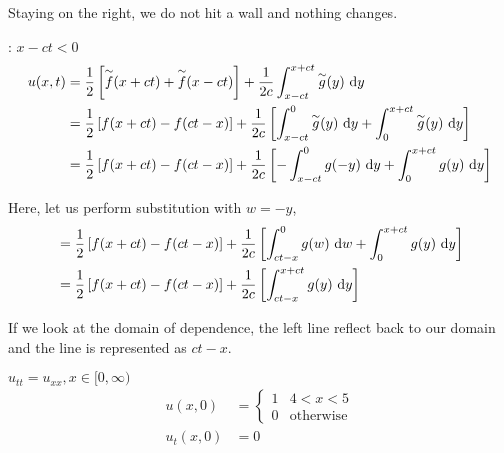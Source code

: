 Staying on the right, we do not hit a wall and nothing changes.

: $x - ct < 0$
%
\begin{align}
  u(x, t)
  & = \frac{1}{2} \left[ \overset{\sim}{f}(x + ct) + \overset{\sim}{f}(x - ct) \right] +
  \frac{1}{2c} \int^{x + ct}_{x - ct} \overset{\sim}{g}(y)\ \text dy\\
  & = \frac{1}{2} \left[ f(x + ct) - f(ct - x) \right] +
  \frac{1}{2c}
  \left[
  \int^{0}_{x - ct} \overset{\sim}{g}(y)\ \text dy +
  \int^{x + ct}_{0} \overset{\sim}{g}(y)\ \text dy
   \right]\\
   & = \frac{1}{2} \left[ f(x + ct) - f(ct - x) \right] +
   \frac{1}{2c}
   \left[
   -\int^{0}_{x - ct} g(-y)\ \text dy +
   \int^{x + ct}_{0} g(y)\ \text dy
    \right]
\end{align}

Here, let us perform substitution with $w = -y$,
%
\begin{align}
  & = \frac{1}{2} \left[ f(x + ct) - f(ct - x) \right] +
  \frac{1}{2c}
  \left[
  \int^{0}_{ct - x} g(w)\ \text dw +
  \int^{x + ct}_{0} g(y)\ \text dy
  \right]\\
  & = \frac{1}{2} \left[ f(x + ct) - f(ct - x) \right] +
  \frac{1}{2c}
  \left[
  \int^{x + ct}_{ct - x} g(y)\ \text dy
  \right]
\end{align}

If we look at the domain of dependence, the left line reflect back to our domain and the line is represented as $ct - x$.

\ex $u_{tt} = u_{xx}, x \in [0, \infty)$
%
\begin{align}
  u(x, 0) & =
  \begin{cases}
    1 & 4 < x < 5\\
    0 & \text{otherwise}
  \end{cases}\\
  u_t(x, 0) & = 0
\end{align}
